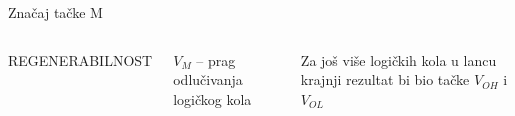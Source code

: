 \begin{frame}[label=08-s021]{Značaj tačke M}
\centering\par
\begin{columns}[c,onlytextwidth]\gusttekst
REGENERABILNOST\par\bigskip
$V_M$ – prag odlučivanja logičkog kola\par\bigskip
Za još više logičkih kola u lancu krajnji rezultat bi bio tačke $V_{OH}$ i $V_{OL}$
\centering\end{columns}
\end{frame}
